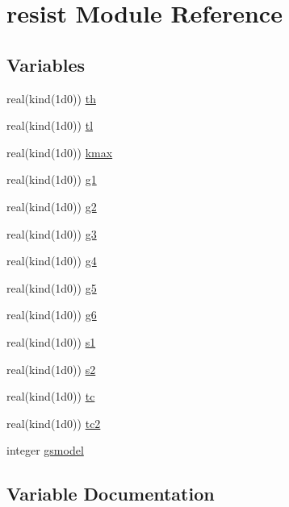 \hypertarget{namespaceresist}{}\section{resist Module Reference}
\label{namespaceresist}
\subsection*{Variables}
\begin{DoxyCompactItemize}
\item 
real(kind(1d0)) \hyperlink{namespaceresist_a4a4f565342a527412998f585a5c126be}{th}
\item 
real(kind(1d0)) \hyperlink{namespaceresist_ac5a785e8c6079704fe779baff78c5c54}{tl}
\item 
real(kind(1d0)) \hyperlink{namespaceresist_ab582d1ab5eac071afaba0e8b351311ff}{kmax}
\item 
real(kind(1d0)) \hyperlink{namespaceresist_a55e0021876c70be1f609dc187f92f705}{g1}
\item 
real(kind(1d0)) \hyperlink{namespaceresist_a98bae857808870e126fd947cdb3b9b14}{g2}
\item 
real(kind(1d0)) \hyperlink{namespaceresist_a35b3f7080e2cc3d5883dbd59f8cfb21b}{g3}
\item 
real(kind(1d0)) \hyperlink{namespaceresist_a9d34a5c68ab32cd207e570225330120b}{g4}
\item 
real(kind(1d0)) \hyperlink{namespaceresist_aca3b131857592b71ec28cce48a2fb0ee}{g5}
\item 
real(kind(1d0)) \hyperlink{namespaceresist_a7ad9926600ac79377439521a837b21de}{g6}
\item 
real(kind(1d0)) \hyperlink{namespaceresist_a8ce25344e41b31f4da68572adc0b8391}{s1}
\item 
real(kind(1d0)) \hyperlink{namespaceresist_a0edd3d2ed03de65fa65ffe839661d97c}{s2}
\item 
real(kind(1d0)) \hyperlink{namespaceresist_a018715832aa4e47e3fd4deb59e413da1}{tc}
\item 
real(kind(1d0)) \hyperlink{namespaceresist_a39c5aa18f024567bd7365dbdfe6c7216}{tc2}
\item 
integer \hyperlink{namespaceresist_a89895984ab23ef2627cb851eadd8b858}{gsmodel}
\end{DoxyCompactItemize}


\subsection{Variable Documentation}
\mbox{\label{namespaceresist_a55e0021876c70be1f609dc187f92f705}} 
